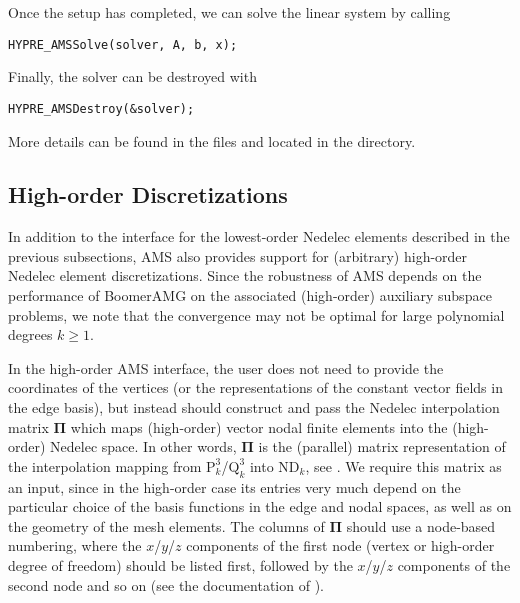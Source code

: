 \noindent
Once the setup has completed, we can solve the linear system by calling
\begin{display}\begin{verbatim}
HYPRE_AMSSolve(solver, A, b, x);
\end{verbatim}\end{display}

\noindent
Finally, the solver can be destroyed with
\begin{display}\begin{verbatim}
HYPRE_AMSDestroy(&solver);
\end{verbatim}\end{display}

\noindent
More details can be found in the files  and 
located in the  directory.

\subsection{High-order Discretizations}
In addition to the interface for the lowest-order Nedelec elements described in
the previous subsections, AMS also provides support for (arbitrary) high-order
Nedelec element discretizations. Since the robustness of AMS depends on the
performance of BoomerAMG on the associated (high-order) auxiliary subspace
problems, we note that the convergence may not be optimal for large polynomial
degrees $k \geq 1$.

In the high-order AMS interface, the user does not need to provide the
coordinates of the vertices (or the representations of the constant vector
fields in the edge basis), but instead should construct and pass the Nedelec
interpolation matrix ${\mathbf \Pi}$ which maps (high-order) vector nodal finite
elements into the (high-order) Nedelec space. In other words, ${\mathbf \Pi}$ is
the (parallel) matrix representation of the interpolation mapping from
$\mathrm{P}_k^3$/$\mathrm{Q}_k^3$ into $\mathrm{ND}_k$, see \cite{xu_H_curl,
  ams_jcm}.  We require this matrix as an input, since in the high-order case
its entries very much depend on the particular choice of the basis functions in
the edge and nodal spaces, as well as on the geometry of the mesh elements. The
columns of ${\mathbf \Pi}$ should use a node-based numbering, where the
$x$/$y$/$z$ components of the first node (vertex or high-order degree of
freedom) should be listed first, followed by the $x$/$y$/$z$ components of the
second node and so on (see the documentation of ).

